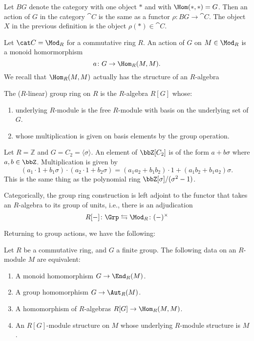 \documentclass{willowtreebook}
\begin{document}
\begin{remark}
    Let $BG$ denote the category with one object $\ast$ and with $\Hom(\ast,\ast) = G$. Then an action of $G$ in the category $\cat C$ is the same as a functor $\rho \colon BG \to \cat C$. The object $X$ in the previous definition is the object $\rho(\ast) \in \cat C$. 
\end{remark}
\begin{remark}
    Let $\cat C = \Mod_R$ for a commutative ring $R$. An action of $G$ on $M \in \Mod_R$ is a monoid homormorphism
    \[
a \colon G \to \Hom_R(M,M).
    \]
    We recall that $\Hom_R(M,M)$ actually has the structure of an $R$-algebra
\end{remark}
\begin{definition}
    The ($R$-linear) group ring on $R$ is the $R$-algebra $R[G]$ whose:
    \begin{enumerate}[label=(\alph*)]
    \item underlying $R$-module is the free $R$-module with basis on the underlying set of $G$. 
    \item whose multiplication is given on basis elements by the group operation. 
    \end{enumerate}
\end{definition}
\begin{example}
    Let $R = \mathbb{Z}$ and $G = C_2 = \langle \sigma \rangle$. An element of $\bbZ[C_2]$ is of the form $a + b\sigma$ where $a,b \in \bbZ$. Multiplication is given by
    \[
(a_1 \cdot 1+b_1\sigma)\cdot(a_2\cdot 1+b_2\sigma) = (a_1a_2+b_1b_2)\cdot 1  + (a_1b_2+b_1a_2)\sigma. 
    \]
    This is the same thing as the polynomial ring $\bbZ[\sigma]/(\sigma^2-1)$. 
\end{example}
\begin{remark}
    Categorically, the group ring construction is left adjoint to the functor that takes an $R$-algebra to its group of units, i.e., there is an adjudication
    \[
R[-] \colon \Grp \leftrightarrows \Mod_R \colon (-)^{
\times}
    \]
\end{remark}
Returning to group actions, we have the following:
\begin{proposition}
    Let $R$ be a commutative ring, and $G$ a finite group. The following data on an $R$-module $M$ are equivalent:
    \begin{enumerate}
        \item A monoid homomorphism $G \to \End_R(M)$.
        \item A group homomorphism $G \to \Aut_R(M)$. 
        \item A homomorphism of $R$-algebras $R[G] \to \Hom_R(M,M)$. 
        \item An $R[G]$-module structure on $M$ whose underlying $R$-module structure is $M$. 
    \end{enumerate}
\end{proposition}
\end{document}
